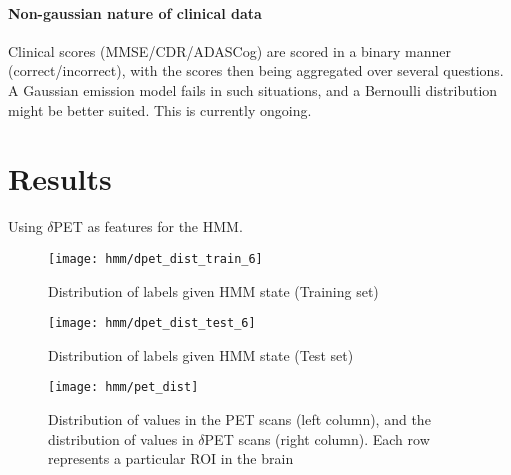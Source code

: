 \documentclass[12pt,a4paper]{article}
\begin{document}
\paragraph{Non-gaussian nature of clinical data}

Clinical scores (MMSE/CDR/ADAS\-Cog) are scored in a
binary manner (correct/incorrect), with the scores then being
aggregated over several questions. A Gaussian emission model fails in
such situations, and a Bernoulli distribution might be better
suited. This is currently ongoing.

\section{Results}
\label{sec:results}

Using $\delta $PET as features for the HMM.

\begin{figure}[H]
  \centering
  \texttt{[image: hmm/dpet\_dist\_train\_6]}
  \caption{Distribution of labels given HMM state (Training set)}  
\end{figure}

\begin{figure}[H]
  \centering
  \texttt{[image: hmm/dpet\_dist\_test\_6]}
  \caption{Distribution of labels given HMM state (Test set)}  
\end{figure}

\begin{figure}[H]
  \centering
  \texttt{[image: hmm/pet\_dist]}
  \caption{Distribution of values in the PET scans (left column), and
    the distribution of values in $\delta $PET scans (right
    column). Each row represents a particular ROI in the brain}
\end{figure}
\end{document}
